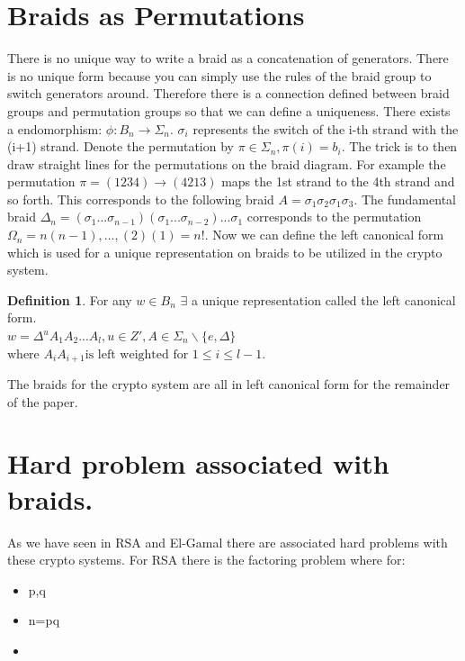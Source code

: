 \documentclass{article}
\theoremstyle{definition}
\newtheorem{definition}{Definition}[section]
\begin{document}
	
\section{Braids as Permutations}
	There is no unique way to write a braid as a concatenation of generators. There is no unique form because you can simply use the rules of the braid group to switch generators around. Therefore there is a connection defined between braid groups and permutation groups so that we can define a uniqueness. There exists a endomorphism:
	$ \phi: B_n \rightarrow \Sigma_n$.
	$\sigma_i $ represents the switch of the i-th strand with the (i+1) strand. 
	Denote the permutation by $\pi \in \Sigma_n, \pi(i)=b_i$. The trick is to then draw straight lines for the permutations on the braid diagram. For example the permutation $\pi=(1 2 3 4)\rightarrow(4 2 1 3)$ maps the 1st strand to the 4th strand and so forth. This corresponds to the following braid $A=\sigma_1 \sigma_2 \sigma_1 \sigma_3$. The fundamental braid $\Delta_n=(\sigma_1...\sigma_{n-1})(\sigma_1 ... \sigma_{n-2})...\sigma_1 $ corresponds to the permutation $\Omega_n=n(n-1),...,(2)(1)=n!$. Now we can define the left canonical form which is used for a unique representation on braids to be utilized in the crypto system.
	
	\begin{definition}	
	For any $w \in B_n$ $\exists$ a unique representation called the left canonical form.
	\\$w = \Delta^u A_1 A_2 ... A_l, u \in Z', A \in \Sigma_n \backslash \{ e, \Delta \} $
	$\text{where } A_i A_{i+1} \text{is left weighted for } 1 \leq i \leq l - 1.$
	\end{definition}
	
	The braids for the crypto system are all in left canonical form for the remainder of the paper. 
	 
	\section{Hard problem associated with braids.}
	As we have seen in RSA and El-Gamal there are associated hard problems with these crypto systems. For RSA there is the factoring problem where for:
	
	\begin{itemize}
		\item p,q 
		\item n=pq 
		\item {} 
	\end{itemize}
\end{document}
